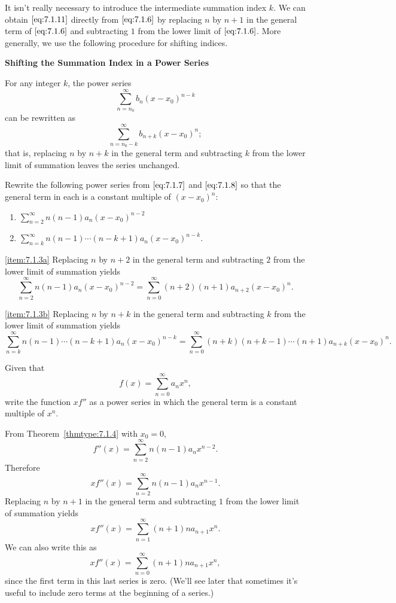 \documentclass{ximera}
\begin{document}
It isn't  really necessary to introduce the intermediate summation
index $k$. We can obtain $\eqref{eq:7.1.11}$ directly from $\eqref{eq:7.1.6}$
by replacing $n$ by $n+1$ in the general term of $\eqref{eq:7.1.6}$ and
subtracting $1$ from the lower limit of $\eqref{eq:7.1.6}$. More generally, we use the following procedure for shifting indices.

\begin{procedure}
{\bf Shifting the Summation Index in a Power
Series}

For any integer $k$,  the power series
$$
\sum_{n=n_0}^\infty b_n(x-x_0)^{n-k}
$$
can be rewritten  as
$$
\sum_{n=n_0-k}^\infty b_{n+k}(x-x_0)^n;
$$
that is, replacing $n$ by $n+k$ in the general term and subtracting
$k$ from the lower limit of summation leaves the series unchanged.
\end{procedure}

\begin{example}\label{example:7.1.3}
Rewrite the following power series from $\eqref{eq:7.1.7}$  and $\eqref{eq:7.1.8}$
so that the general term in each  is a  constant multiple of
$(x-x_0)^n$:
\begin{enumerate}
    \item \label{item:7.1.3a}
$\sum_{n=2}^\infty
n(n-1)a_n(x-x_0)^{n-2}$
\item \label{item:7.1.3b}
$\sum_{n=k}^\infty
n(n-1)\cdots(n-k+1)a_n(x-x_0)^{n-k}.
$
\end{enumerate}

\begin{explanation}
\ref{item:7.1.3a} Replacing $n$ by $n+2$ in the general term
and subtracting $2$ from the lower limit of summation yields
$$
\sum_{n=2}^\infty n(n-1)a_n(x-x_0)^{n-2}=
\sum_{n=0}^\infty (n+2)(n+1)a_{n+2}(x-x_0)^n.
$$

\ref{item:7.1.3b}  Replacing $n$ by $n+k$ in the general term
and subtracting $k$ from the lower limit of summation yields
$$
\sum_{n=k}^\infty
n(n-1)\cdots(n-k+1)a_n(x-x_0)^{n-k}=
\sum_{n=0}^\infty (n+k)(n+k-1)\cdots(n+1)a_{n+k}(x-x_0)^n.
$$
\end{explanation}
\end{example}

\begin{example}\label{example:7.1.4}
Given that
$$
f(x)=\sum_{n=0}^\infty a_nx^n,
$$
write the function $xf''$  as a power series in which the general term
is a  constant multiple of $x^n$.

\begin{explanation}
From Theorem~\ref{thmtype:7.1.4} with $x_0=0$,
$$
f''(x)=\sum_{n=2}^\infty n(n-1)a_nx^{n-2}.
$$
Therefore
$$
xf''(x)=\sum_{n=2}^\infty n(n-1)a_nx^{n-1}.
$$
Replacing $n$ by $n+1$ in the general term and  subtracting $1$
from the lower limit of summation yields
$$
xf''(x)=\sum_{n=1}^\infty (n+1)na_{n+1}x^n.
$$
We can also write this as
$$
xf''(x)=\sum_{n=0}^\infty (n+1)na_{n+1}x^n,
$$
since the first term in this last series is zero.  (We'll see
later that  sometimes it's useful to include zero terms at the
beginning of a series.)

\end{explanation}
\end{example}
\end{document}
